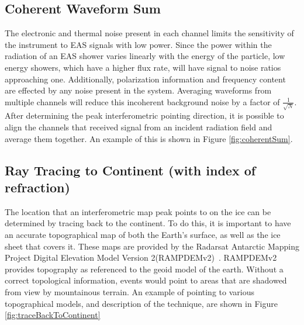 		
	\subsection{Coherent Waveform Sum}
		The electronic and thermal noise present in each channel limits the sensitivity of the instrument to EAS signals with low power.  Since the power within the radiation of an EAS shower varies linearly with the energy of the particle, low energy showers, which have a higher flux rate, will have signal to noise ratios approaching one.  Additionally, polarization information and frequency content are effected by any noise present in the system.  Averaging waveforms from multiple channels will reduce this incoherent background noise by a factor of $\frac{1}{\sqrt{N}}$.  After determining the peak interferometric pointing direction, it is possible to align the channels that received signal from an incident radiation field and average them together.  An example of this is shown in Figure \ref{fig:coherentSum}.
	
	
	\subsection{Ray Tracing to Continent (with index of refraction)}
		 The location that an interferometric map peak points to on the ice can be determined by tracing back to the continent.  To do this, it is important to have an accurate topographical map of both the Earth's surface, as well as the ice sheet that covers it.  These maps are provided by the Radarsat Antarctic Mapping Project Digital Elevation Model Version 2(RAMPDEMv2)~\cite{RAMPDEM}.  RAMPDEMv2 provides topography as referenced to the geoid model of the earth.  Without a correct topological information, events would point to areas that are shadowed from view by mountainous terrain.  An example of pointing to various topographical models, and description of the technique, are shown in Figure \ref{fig:traceBackToContinent}
		 
